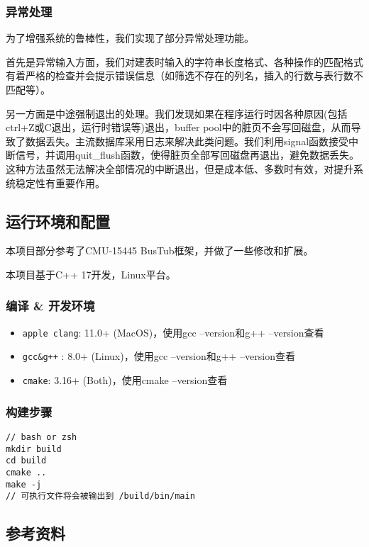 \documentclass[12pt, a4paper]{article}
\def\c#1{\texttt{#1}}
\def\ss#1{\subsection{#1}}
\def\sss#1{\subsubsection{#1}}
\def\p{\par}
\begin{document}
\sss{异常处理}
\p 为了增强系统的鲁棒性，我们实现了部分异常处理功能。
\p 首先是异常输入方面，我们对建表时输入的字符串长度格式、各种操作的匹配格式有着严格的检查并会提示错误信息（如筛选不存在的列名，插入的行数与表行数不匹配等）。
\p 另一方面是中途强制退出的处理。我们发现如果在程序运行时因各种原因(包括ctrl+Z或C退出，运行时错误等)退出，buffer pool中的脏页不会写回磁盘，从而导致了数据丢失。主流数据库采用日志来解决此类问题。我们利用signal函数接受中断信号，并调用quit\_flush函数，使得脏页全部写回磁盘再退出，避免数据丢失。这种方法虽然无法解决全部情况的中断退出，但是成本低、多数时有效，对提升系统稳定性有重要作用。
\ss{运行环境和配置}
\p 本项目部分参考了CMU-15445 BusTub框架，并做了一些修改和扩展。
\p 本项目基于C++ 17开发，Linux平台。
\sss{编译 \& 开发环境}
\begin{itemize}
	\item \c{apple clang}: 11.0+ (MacOS)，使用gcc --version和g++ --version查看
 \item \c{gcc\&g++} : 8.0+ (Linux)，使用gcc --version和g++ --version查看
 \item \c{cmake}: 3.16+ (Both)，使用cmake --version查看
\end{itemize}
\sss{构建步骤}
\begin{lstlisting}[style = customc]
// bash or zsh
mkdir build
cd build
cmake ..
make -j
// 可执行文件将会被输出到 /build/bin/main
\end{lstlisting}
\ss{参考资料}
\end{document}
